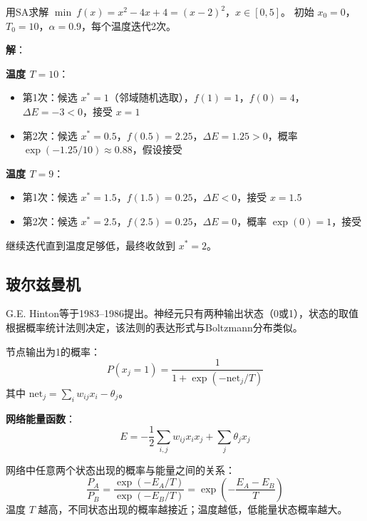 \begin{example}[模拟退火求解函数极小值]\label{ex:sa}
用SA求解 $\min\ f(x) = x^2 - 4x + 4 = (x-2)^2$，$x \in [0, 5]$。
初始 $x_0 = 0$，$T_0 = 10$，$\alpha = 0.9$，每个温度迭代2次。

\textbf{解}：

\textbf{温度 $T = 10$}：
\begin{itemize}
    \item 第1次：候选 $x^* = 1$（邻域随机选取），$f(1) = 1$，$f(0) = 4$，$\Delta E = -3 < 0$，接受 $x = 1$
    \item 第2次：候选 $x^* = 0.5$，$f(0.5) = 2.25$，$\Delta E = 1.25 > 0$，概率 $\exp(-1.25/10) \approx 0.88$，假设接受
\end{itemize}

\textbf{温度 $T = 9$}：
\begin{itemize}
    \item 第1次：候选 $x^* = 1.5$，$f(1.5) = 0.25$，$\Delta E < 0$，接受 $x = 1.5$
    \item 第2次：候选 $x^* = 2.5$，$f(2.5) = 0.25$，$\Delta E = 0$，概率 $\exp(0) = 1$，接受
\end{itemize}

继续迭代直到温度足够低，最终收敛到 $x^* = 2$。
\end{example}

\subsection{玻尔兹曼机}

\begin{definition}[Boltzmann机]
G.E. Hinton等于1983--1986提出。神经元只有两种输出状态（0或1），状态的取值根据概率统计法则决定，该法则的表达形式与Boltzmann分布类似。

节点输出为1的概率：
\[
P(x_j = 1) = \frac{1}{1 + \exp(-\text{net}_j / T)}
\]
其中 $\text{net}_j = \sum_i w_{ij} x_i - \theta_j$。

\textbf{网络能量函数}：
\[
E = -\frac{1}{2}\sum_{i,j} w_{ij} x_i x_j + \sum_j \theta_j x_j
\]
\end{definition}

\begin{property}[Boltzmann分布]
网络中任意两个状态出现的概率与能量之间的关系：
\[
\frac{P_A}{P_B} = \frac{\exp(-E_A / T)}{\exp(-E_B / T)} = \exp\left(-\frac{E_A - E_B}{T}\right)
\]
温度 $T$ 越高，不同状态出现的概率越接近；温度越低，低能量状态概率越大。
\end{property}

